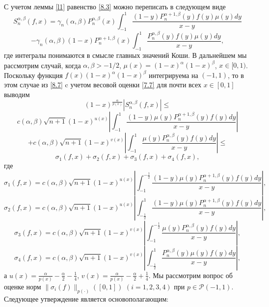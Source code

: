 С учетом леммы \ref{l1} равенство \eqref{8.3} можно переписать в следующем виде
$$
S_n^{\alpha,\beta}(f,x)=\gamma_n(\alpha,\beta)P_n^{\alpha,\beta}(x)\int_{-1}^1
\frac{(1-y)P_n^{\alpha+1,\beta}(y)f(y)\mu(y)dy}{x-y}
$$
\begin{equation}\label{8.7}
-\gamma_n(\alpha,\beta)(1-x)P_n^{\alpha+1,\beta}(x)\int_{-1}^1
\frac{P_n^{\alpha,\beta}(y)f(y)\mu(y)dy}{x-y},
\end{equation}
где интегралы понимаются в смысле главных значений Коши. В дальнейшем %
мы рассмотрим случай, когда $\alpha,\beta>-1/2$, $\mu(x)=(1-x)^\alpha(1-x)^\beta$, $x\in[0,1)$.
 Поскольку функция $f(x)(1-x)^\alpha(1-x)^\beta$ интегрируема на $(-1,1)$, то в этом случае из \eqref{8.7} c учетом весовой оценки \eqref{7.7} для почти всех
 $x\in[0,1]$ выводим
 $$
(1-x)^{\frac{\alpha}{p(x)}}|S_n^{\alpha,\beta}(f,x)|\le
$$
$$
c(\alpha,\beta)\sqrt{n+1}(1-x)^{u(x)}\left|\int_{-1}^1
\frac{(1-y)\mu(y) P_n^{\alpha+1,\beta}(y)f(y)dy}{x-y}\right|
$$
$$
+c(\alpha,\beta)\sqrt{n+1}(1-x)^{v(x)}\left|\int_{-1}^1
\frac{\mu(y)P_n^{\alpha,\beta}(y)f(y)dy}{x-y}\right|\le
$$
\begin{equation}\label{8.8}
\sigma_1(f,x)+\sigma_2(f,x)+\sigma_3(f,x)+\sigma_4(f,x),
\end{equation}
где
\begin{equation}\label{8.9}
\sigma_1(f,x)=c(\alpha,\beta)\sqrt{n+1}(1-x)^{u(x)}\left|\int_{-1}^{-\frac12}
\frac{(1-y)\mu(y) P_n^{\alpha+1,\beta}(y)f(y)dy}{x-y}\right|,
\end{equation}
\begin{equation}\label{8.10}
\sigma_2(f,x)=c(\alpha,\beta)\sqrt{n+1}(1-x)^{u(x)}\left|\int_{-\frac12}^{1}
\frac{(1-y)\mu(y) P_n^{\alpha+1,\beta}(y)f(y)dy}{x-y}\right|,
\end{equation}
\begin{equation}\label{8.11}
\sigma_3(f,x)=c(\alpha,\beta)\sqrt{n+1}(1-x)^{v(x)}\left|\int_{-1}^{-\frac12}
\frac{\mu(y) P_n^{\alpha,\beta}(y)f(y)dy}{x-y}\right|,
\end{equation}
\begin{equation}\label{8.12}
\sigma_4(f,x)=c(\alpha,\beta)\sqrt{n+1}(1-x)^{v(x)}\left|\int_{-\frac12}^{1}
\frac{ P_n^{\alpha,\beta}(y)\mu(y)f(y)dy}{x-y}\right|,
\end{equation}
а $u(x)=\frac{\alpha}{p(x)}-\frac{\alpha}{2}-\frac14$, $v(x)=\frac{\alpha}{p(x)}-\frac{\alpha}{2}+\frac14$. Мы рассмотрим вопрос об оценке норм
$\|\sigma_i(f)\|_{p(\cdot)}([0,1])$ $(i=1,2,3,4)$ при $p \in \mathcal{ P}(-1,1)$.
Следующее утверждение является основополагающим:

